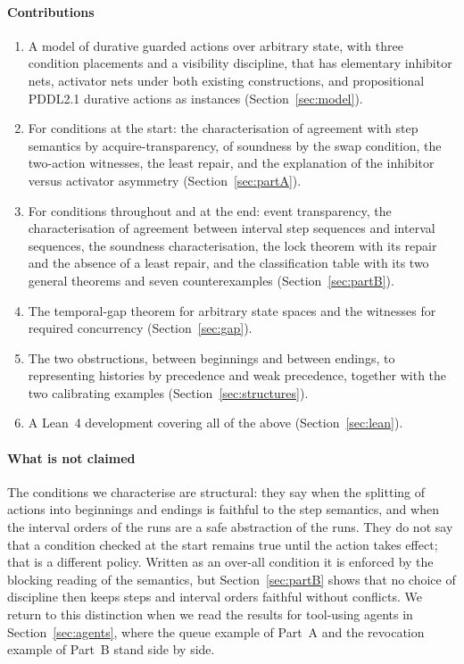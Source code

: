 \documentclass[preprint,12pt]{elsarticle}
\theoremstyle{plain}
\theoremstyle{definition}
\begin{document}
\paragraph{Contributions}
\begin{enumerate}
\item A model of durative guarded actions over arbitrary state, with three condition placements and a visibility discipline, that has elementary inhibitor nets, activator nets under both existing constructions, and propositional PDDL2.1 durative actions as instances (Section~\ref{sec:model}).
\item For conditions at the start: the characterisation of agreement with step semantics by acquire-transparency, of soundness by the swap condition, the two-action witnesses, the least repair, and the explanation of the inhibitor versus activator asymmetry (Section~\ref{sec:partA}).
\item For conditions throughout and at the end: event transparency, the characterisation of agreement between interval step sequences and interval sequences, the soundness characterisation, the lock theorem with its repair and the absence of a least repair, and the classification table with its two general theorems and seven counterexamples (Section~\ref{sec:partB}).
\item The temporal-gap theorem for arbitrary state spaces and the witnesses for required concurrency (Section~\ref{sec:gap}).
\item The two obstructions, between beginnings and between endings, to representing histories by precedence and weak precedence, together with the two calibrating examples (Section~\ref{sec:structures}).
\item A Lean~4 development covering all of the above (Section~\ref{sec:lean}).
\end{enumerate}

\paragraph{What is not claimed}
The conditions we characterise are structural: they say when the splitting of actions into beginnings and endings is faithful to the step semantics, and when the interval orders of the runs are a safe abstraction of the runs. They do not say that a condition checked at the start remains true until the action takes effect; that is a different policy. Written as an over-all condition it is enforced by the blocking reading of the semantics, but Section~\ref{sec:partB} shows that no choice of discipline then keeps steps and interval orders faithful without conflicts. We return to this distinction when we read the results for tool-using agents in Section~\ref{sec:agents}, where the queue example of Part~A and the revocation example of Part~B stand side by side.
\end{document}
